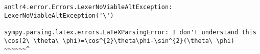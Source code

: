\begin{verbatim}
antlr4.error.Errors.LexerNoViableAltException: LexerNoViableAltException('\')

sympy.parsing.latex.errors.LaTeXParsingError: I don't understand this
\cos(2\ \theta\ \phi)=\cos^{2}\theta\phi-\sin^{2}(\theta\ \phi)
~~~~~~^
\end{verbatim}